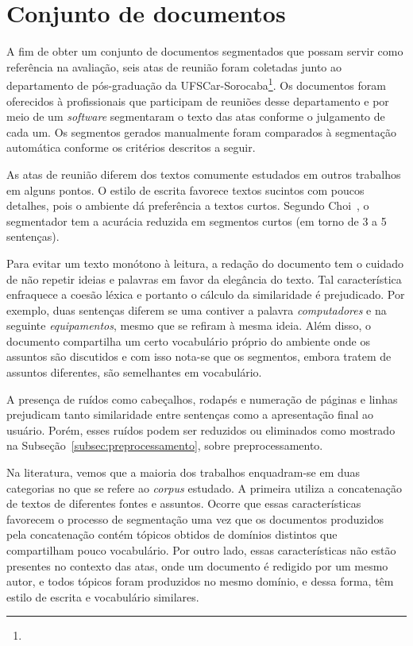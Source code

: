 
\section{Conjunto de documentos}
	\label{sec:conjutodedocumentos} 


	A fim de obter um conjunto de documentos segmentados que possam servir como referência na avaliação, seis atas de reunião foram coletadas junto ao departamento de pós-graduação da UFSCar-Sorocaba\footnote{\urlatas}. Os documentos foram oferecidos à profissionais que participam de reuniões desse departamento e por meio de um \textit{software} segmentaram o texto das atas conforme o julgamento de cada um. Os segmentos gerados manualmente foram comparados à segmentação automática conforme os critérios descritos a seguir.

	
 As atas de reunião diferem dos textos comumente estudados em outros trabalhos em alguns pontos. O estilo de escrita favorece textos sucintos com poucos detalhes, pois o ambiente dá preferência a textos curtos. Segundo Choi~\cite{Choi2001-LSA}, o segmentador tem a acurácia reduzida em segmentos curtos (em torno de 3 a 5 sentenças).
	
	Para evitar um texto monótono à leitura, a redação do documento tem o cuidado de não repetir ideias e palavras em favor da elegância do texto. Tal característica enfraquece a coesão léxica e portanto o cálculo da similaridade é prejudicado. Por exemplo, duas sentenças diferem se uma contiver a palavra \textit{computadores} e na seguinte \textit{equipamentos}, mesmo que se refiram à mesma ideia. Além disso, o documento compartilha um certo vocabulário próprio do ambiente onde os assuntos são discutidos e com isso nota-se que os segmentos, embora tratem de assuntos diferentes, são semelhantes em vocabulário.
	
A presença de ruídos como cabeçalhos, rodapés e numeração de páginas e linhas prejudicam tanto similaridade entre sentenças como a apresentação final ao usuário. Porém, esses ruídos podem ser reduzidos ou eliminados como mostrado na Subseção~\ref{subsec:preprocessamento}, sobre preprocessamento.



 
Na literatura, vemos que a maioria dos trabalhos enquadram-se em duas categorias no que se refere ao \textit{corpus} estudado.  
% 
%
A primeira utiliza a concatenação de textos de diferentes fontes e assuntos. 
Ocorre que essas características favorecem o processo de segmentação uma vez que os documentos produzidos pela concatenação contém tópicos obtidos de domínios distintos que compartilham pouco vocabulário. Por outro lado, essas características não estão presentes no contexto das atas, onde um documento é redigido por um mesmo autor, e todos tópicos foram produzidos no mesmo domínio, e dessa forma, têm estilo de escrita e vocabulário similares.


